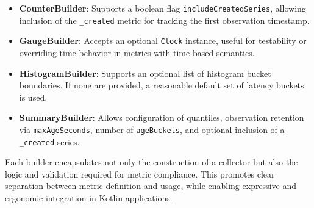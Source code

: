 \begin{itemize}
    \item \textbf{CounterBuilder}: Supports a boolean flag \texttt{includeCreatedSeries}, allowing inclusion of the \texttt{\_created} metric for tracking the first observation timestamp.

    \item \textbf{GaugeBuilder}: Accepts an optional \texttt{Clock} instance, useful for testability or overriding time behavior in metrics with time-based semantics.

    \item \textbf{HistogramBuilder}: Supports an optional list of histogram bucket boundaries. If none are provided, a reasonable default set of latency buckets is used.

    \item \textbf{SummaryBuilder}: Allows configuration of quantiles, observation retention via \texttt{maxAgeSeconds}, number of \texttt{ageBuckets}, and optional inclusion of a \texttt{\_created} series.
\end{itemize}

Each builder encapsulates not only the construction of a collector but also the logic and validation required for metric compliance. This promotes clear separation between metric definition and usage, while enabling expressive and ergonomic integration in Kotlin applications.

